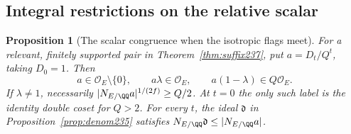 \documentclass[a4paper,11pt]{article}
\newtheorem{proposition}{Proposition}[section]
\theoremstyle{definition}
\theoremstyle{remark}
\numberwithin{equation}{section}
\begin{document}
\subsection{Integral restrictions on the relative scalar}\label{nav:VI-31}
\begin{proposition}[The scalar congruence when the isotropic flags meet]
\leavevmode\label{prop:finite237}
For a relevant, finitely supported pair in
Theorem~\ref{thm:suffix237}, put \(a=D_t/Q^t\), taking
\(D_0=1\). Then
\[
 a\in\mathcal O_E\setminus\{0\},\qquad
 a\lambda\in\mathcal O_E,\qquad a(1-\lambda)\in Q\mathcal O_E .
\]
If \(\lambda\ne1\), necessarily
\(|N_{E/\QQ}a|^{1/(2f)}\ge Q/2\). At \(t=0\) the only such
label is the identity double coset for \(Q>2\).
For every \(t\), the ideal \(\mathfrak d\) in
Proposition~\ref{prop:denom235} satisfies
\(N_{E/\QQ}\mathfrak d\le |N_{E/\QQ}a|\).
\end{proposition}
\end{document}
